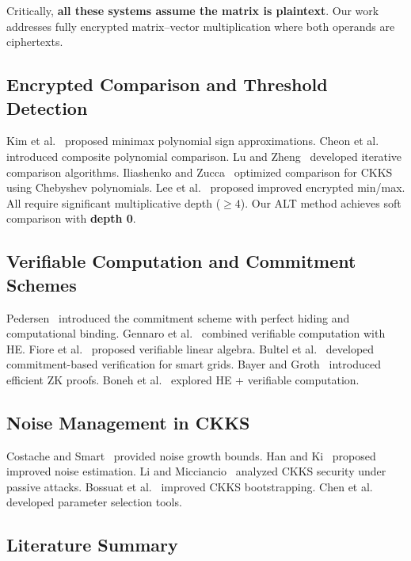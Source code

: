 \documentclass[conference,12pt]{IEEEtran}
\begin{document}
Critically, \textbf{all these systems assume the matrix is plaintext}. Our work addresses fully encrypted matrix--vector multiplication where both operands are ciphertexts.

\subsection{Encrypted Comparison and Threshold Detection}

Kim et al.~\cite{Kim2018comparison} proposed minimax polynomial sign approximations. Cheon et al.~\cite{Cheon2019comparison} introduced composite polynomial comparison. Lu and Zheng~\cite{Lu2021} developed iterative comparison algorithms. Iliashenko and Zucca~\cite{Iliashenko2021} optimized comparison for CKKS using Chebyshev polynomials. Lee et al.~\cite{Lee2022} proposed improved encrypted min/max. All require significant multiplicative depth ($\geq 4$). Our ALT method achieves soft comparison with \textbf{depth 0}.

\subsection{Verifiable Computation and Commitment Schemes}

Pedersen~\cite{Pedersen1991} introduced the commitment scheme with perfect hiding and computational binding. Gennaro et al.~\cite{Gennaro2010} combined verifiable computation with HE. Fiore et al.~\cite{Fiore2016} proposed verifiable linear algebra. Bultel et al.~\cite{Bultel2019} developed commitment-based verification for smart grids. Bayer and Groth~\cite{Bayer2012} introduced efficient ZK proofs. Boneh et al.~\cite{Boneh2019} explored HE + verifiable computation.

\subsection{Noise Management in CKKS}

Costache and Smart~\cite{Costache2016} provided noise growth bounds. Han and Ki~\cite{Han2020} proposed improved noise estimation. Li and Micciancio~\cite{Li2021ckks} analyzed CKKS security under passive attacks. Bossuat et al.~\cite{Bossuat2021} improved CKKS bootstrapping. Chen et al.~\cite{Chen2019params} developed parameter selection tools.

\subsection{Literature Summary}
\end{document}

